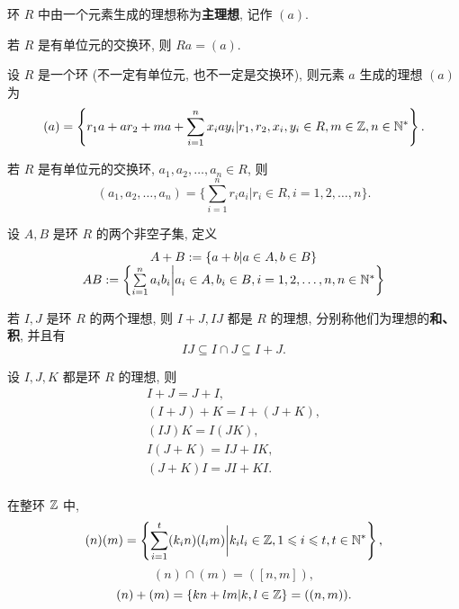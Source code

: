\begin{definition}\label{主理想}
	环 $R$ 中由一个元素生成的理想称为\textbf{主理想}, 记作 $(a)$.
\end{definition}

\begin{property}
	若 $R$ 是有单位元的交换环, 则 $Ra=(a)$.
\end{property}

\begin{proposition}
	设 $R$ 是一个环 (不一定有单位元, 也不一定是交换环), 则元素 $a$ 生成的理想 $(a)$ 为 $$(a)=\left\{r_1a+ar_2+ma+\sum\limits_{i=1}^n x_iay_i|r_1,r_2,x_i,y_i\in R,m\in\mathbb Z,n\in\mathbb N^*\right\}.$$
\end{proposition}

\begin{proposition}
	若 $R$ 是有单位元的交换环, $a_1,a_2,\ldots,a_n\in R$, 则 $$(a_1,a_2,\ldots,a_n)=\{\sum\limits_{i=1}^n r_ia_i|r_i\in R,i=1,2,\ldots,n\}.$$
\end{proposition}

\begin{definition}\label{集合的运算}
	设 $A,B$ 是环 $R$ 的两个非空子集, 定义
	$$
	\begin{array}{c}
		A+B:=\{a+b|a\in A,b\in B\} \\
		AB:=\left\{\sum\limits_{i=1}^n a_ib_i\bigg|a_i\in A,b_i\in B,i=1,2,\ldots,n,n\in\mathbb N^*\right\}
	\end{array}
	$$
\end{definition}

\begin{definition}\label{理想的运算}
	若 $I,J$ 是环 $R$ 的两个理想, 则 $I+J,IJ$ 都是 $R$ 的理想, 分别称他们为理想的\textbf{和、积}, 并且有 $$IJ\subseteq I\cap J\subseteq I+J.$$
\end{definition}

\begin{property}
	设 $I,J,K$ 都是环 $R$ 的理想, 则
	$$
	\begin{array}{c}
		I+J=J+I, \\
		(I+J)+K=I+(J+K), \\
		(IJ)K=I(JK), \\
		I(J+K)=IJ+IK, \\
		(J+K)I=JI+KI. \\
	\end{array}
	$$
\end{property}

\begin{example}
	在整环 $\mathbb Z$ 中,
	\begin{equation}
		(n)(m)=\left\{\sum\limits_{i=1}^t(k_in)(l_im)\bigg|k_il_i\in\mathbb Z,1\leqslant i\leqslant t,t\in\mathbb N^*\right\},
	\end{equation}
	\begin{equation}
		(n)\cap(m)=([n,m]),
	\end{equation}
	\begin{equation}
		(n)+(m)=\{kn+lm|k,l\in\mathbb Z\}=((n,m)).
	\end{equation}

\end{example}


